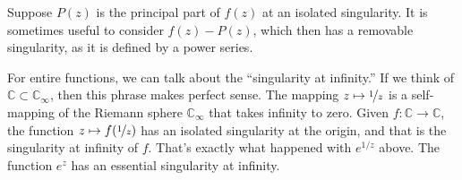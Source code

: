 \documentclass[12pt,openany]{book}
\newcommand{\C}{{\mathbb{C}}}
\newcommand{\myquote}[1]{``#1''}
\theoremstyle{plain}
\theoremstyle{remark}
\theoremstyle{definition}
\theoremstyle{exercise}
\theoremstyle{example}
\begin{document}
Suppose $P(z)$ is the principal part of $f(z)$ at an isolated singularity.
It is sometimes useful to consider $f(z)-P(z)$, which then has a removable
singularity, as it is defined by a power series.

\medskip

For entire functions, we can talk about the
\myquote{singularity at infinity.}
If we think of $\C \subset \C_\infty$, then this phrase makes perfect sense.
The mapping $z \mapsto \nicefrac{1}{z}$ is a self-mapping of the Riemann
sphere $\C_\infty$ that takes infinity to zero.  Given $f \colon \C \to
\C$, the function $z \mapsto f(\nicefrac{1}{z})$ has an isolated
singularity at the origin, and that is the singularity at infinity
of $f$.  That's exactly what happened with $e^{1/z}$ above.  The function
$e^z$ has an essential singularity at infinity.
\end{document}
